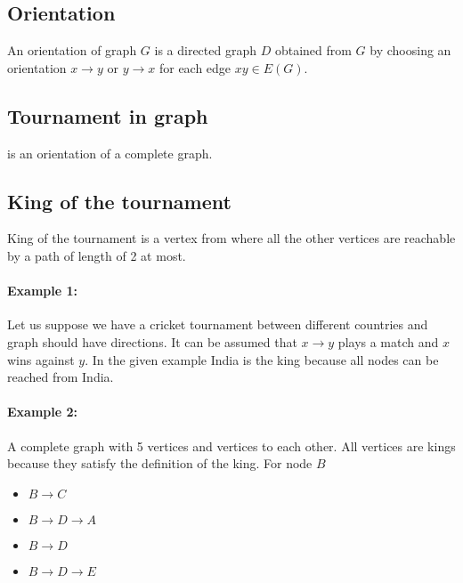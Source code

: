 \subsection{Orientation}

An orientation of graph $G$ is a directed graph $D$ obtained from $G$ by choosing an orientation $ x \to y$ or $y \to x$ for each edge $xy \in E(G) $. 

 
 
\subsection{Tournament in graph}
is an orientation of a complete graph. 

\subsection{King of the tournament}
King of the tournament is a vertex from where all the other vertices are reachable by a path of length of 2 at most.

\paragraph{Example 1:}Let us suppose we have a cricket tournament between different countries and graph should have directions. It can be assumed that $x \to y$ plays a match and $x$ wins against $y$. In the given example India is the king because all nodes can be reached from India.

\paragraph{Example 2:}A complete graph with 5 vertices and vertices to each other. All vertices are kings because they satisfy the definition of the king.
For node $B$
\begin{itemize}
    \item $B \to C$
    \item $B \to D \to A$
    \item $B \to D $
    \item $B \to D \to E$
    \end{itemize}


